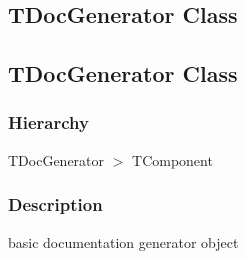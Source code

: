 \documentclass{report}
\begin{document}
\subsection*{\large{\textbf{TDocGenerator Class}}\normalsize\hspace{1ex}\hrulefill}
\else
\subsection*{TDocGenerator Class}
\fi
\label{PasDoc_Gen.TDocGenerator}
\subsubsection*{\large{\textbf{Hierarchy}}\normalsize\hspace{1ex}\hfill}
TDocGenerator {$>$} TComponent
\subsubsection*{\large{\textbf{Description}}\normalsize\hspace{1ex}\hfill}
basic documentation generator object\hfill\vspace*{1ex}
\end{document}
